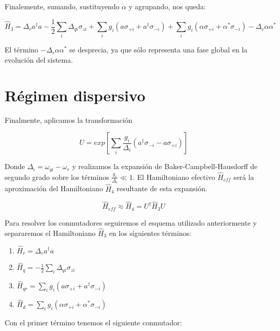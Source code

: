 Finalemente, sumando, sustituyendo $\dot{\alpha}$ y agrupando, nos queda:

\begin{equation}
    \hat{H}_3 = \Delta_r a^\dagger a - \frac{1}{2} \sum\limits_i \Delta_{qi} \sigma_{zi} + \sum\limits_i g_i (a \sigma_{+i} + a^\dagger \sigma_{-i}) + \sum\limits_i g_i (\alpha \sigma_{+i} + \alpha^* \sigma_{-i}) - \Delta_c \alpha \alpha^*
\end{equation}

El término $-\Delta_r \alpha \alpha^*$ se desprecia, ya que sólo representa una fase global en la evolución del sistema.

\section{Régimen dispersivo}

Finalmente, aplicamos la transformación

\begin{equation}
    U = exp[\sum\limits_i \frac{g_i} {\Delta_i} (a^\dagger \sigma_{-i} - a \sigma_{+i})]
\end{equation}

Donde $\Delta_i = \omega_{qi} - \omega_r$ y realizamos la expansión de Baker-Campbell-Hausdorff de segundo grado sobre los términos $\frac{g_i}{\Delta_i} \ll 1$. El Hamiltoniano efectivo $\hat{H}_{eff}$ será la aproximación del Hamiltoniano $\hat{H}_4$ resultante de esta expansión.

\begin{equation}
    \hat{H}_{eff} \approx \hat{H}_4 = U^\dagger \hat{H}_3 U
\end{equation}

Para resolver los conmutadores seguiremos el esquema utilizado anteriormente y separaremos el Hamiltoniano $\hat{H}_3$ en los siguientes términos:

\begin{enumerate}
    \item $\hat{H}_r = \Delta_r a^\dagger a$
    \item $\hat{H}_q = - \frac{1}{2} \sum\limits_i \Delta_{qi} \sigma_{zi}$
    \item $\hat{H}_{qr} = \sum\limits_i g_i (a \sigma_{+i} + a^\dagger \sigma_{-i})$
    \item $\hat{H}_d = \sum\limits_i g_i (\alpha \sigma_{+i} + \alpha^* \sigma_{-i})$
\end{enumerate}

Con el primer término tenemos el siguiente conmutador:

